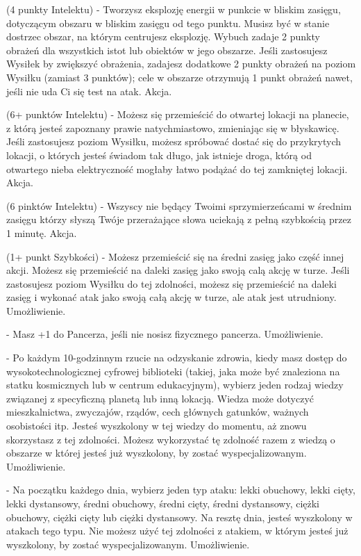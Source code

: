 { (4 punkty Intelektu) - Tworzysz eksplozję energii w punkcie w bliskim zasięgu, dotyczącym obszaru w bliskim zasięgu od tego punktu. Musisz być w stanie dostrzec obszar, na którym centrujesz eksplozję. Wybuch zadaje 2 punkty obrażeń dla wszystkich istot lub obiektów w jego obszarze. Jeśli zastosujesz Wysiłek by zwiększyć obrażenia, zadajesz dodatkowe 2 punkty obrażeń na poziom Wysiłku (zamiast 3 punktów); cele w obszarze otrzymują 1 punkt obrażeń nawet, jeśli nie uda Ci się test na atak. Akcja.

 (6+ punktów Intelektu) - Możesz się przemieścić do otwartej lokacji na planecie, z którą jesteś zapoznany prawie natychmiastowo, zmieniając się w błyskawicę. Jeśli zastosujesz poziom Wysiłku, możesz spróbować dostać się do przykrytych lokacji, o których jesteś świadom tak długo, jak istnieje droga, którą od otwartego nieba elektryczność mogłaby łatwo podążać do tej zamkniętej lokacji. Akcja.

 (6 pinktów Intelektu) - Wszyscy nie będący Twoimi sprzymierzeńcami w średnim zasięgu którzy słyszą Twóje przerażające słowa uciekają z pełną szybkością przez 1 minutę. Akcja.

 (1+ punkt Szybkości) - Możesz przemieścić się na średni zasięg jako część innej akcji. Możesz się przemieścić na daleki zasięg jako swoją calą akcję w turze. Jeśli zastosujesz poziom Wysiłku do tej zdolności, możesz się przemieścić na daleki zasięg i wykonać atak jako swoją całą akcję w turze, ale atak jest utrudniony. Umożliwienie.

 - Masz +1 do Pancerza, jeśli nie nosisz fizycznego pancerza. Umożliwienie.

 - Po każdym 10-godzinnym rzucie na odzyskanie zdrowia, kiedy masz dostęp do wysokotechnologicznej cyfrowej biblioteki (takiej, jaka może być znaleziona na statku kosmicznych lub w centrum edukacyjnym), wybierz jeden rodzaj wiedzy związanej z specyficzną planetą lub inną lokacją. Wiedza może dotyczyć mieszkalnictwa, zwyczajów, rządów, cech głównych gatunków, ważnych osobistości itp. Jesteś wyszkolony w tej wiedzy do momentu, aż znowu skorzystasz z tej zdolności. Możesz wykorzystać tę zdolność razem z wiedzą o obszarze w której jesteś już wyszkolony, by zostać wyspecjalizowanym. Umożliwienie.

 - Na początku każdego dnia, wybierz jeden typ ataku: lekki obuchowy, lekki cięty, lekki dystansowy, średni obuchowy, średni cięty, średni dystansowy, ciężki obuchowy, ciężki cięty lub ciężki dystansowy. Na resztę dnia, jesteś wyszkolony w atakach tego typu. Nie możesz użyć tej zdolności z atakiem, w którym jesteś już wyszkolony, by zostać wyspecjalizowanym. Umożliwienie.

}
